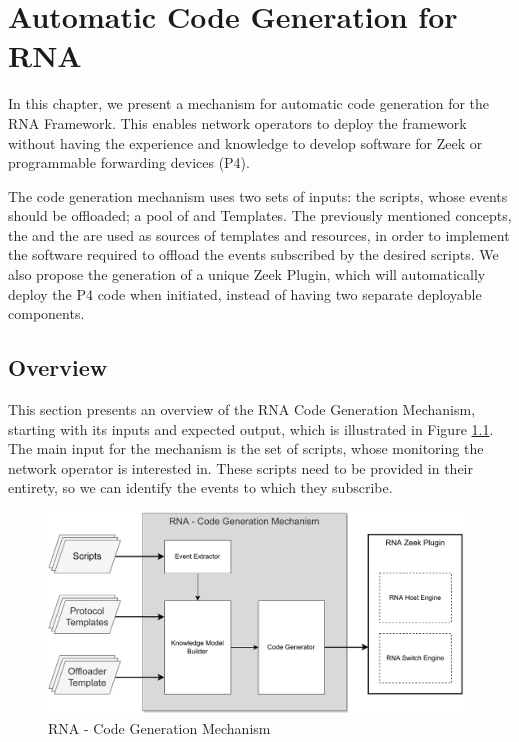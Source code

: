 \chapter{Automatic Code Generation for RNA}
\label{cap:code_gen}


In this chapter, we present a mechanism for automatic code generation for the RNA Framework. This enables network operators to deploy the framework without having the experience and knowledge to develop software for Zeek or programmable forwarding devices (P4).

The code generation mechanism uses two sets of inputs: the scripts, whose events should be offloaded; a pool of \ProtocolTemplates{} and \Offloader{} Templates. The previously mentioned concepts, the \ProtocolTemplates{} and the \Offloaders{} are used as sources of templates and resources, in order to implement the software required to offload the events subscribed by the desired scripts. We also propose the generation of a unique Zeek Plugin, which will automatically deploy the P4 code when initiated, instead of having two separate deployable components.

\section{Overview}
\label{sec:code_gen:overview}

This section presents an overview of the RNA Code Generation Mechanism, starting with its inputs and expected output, which is illustrated in Figure \ref{fig:code_gen_black_box}. The main input for the mechanism is the set of scripts, whose monitoring the network operator is interested in. These scripts need to be provided in their entirety, so we can identify the events to which they subscribe.

\begin{figure}[htb]
    \caption{RNA - Code Generation Mechanism}
    \begin{center}
        \includegraphics[width=0.98\textwidth]{images/code_gen_mechanism.pdf}
    \end{center}
    \label{fig:code_gen_black_box}
\end{figure}

